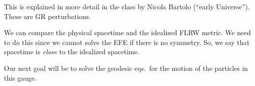 \documentclass[main.tex]{subfiles}
\begin{document}

This is explained in more detail in the class by Nicola Bartolo (``early Universe''). These are GR perturbations. 

We can compare the physical spacetime and the idealized FLRW metric. 
We need to do this since we cannot solve the EFE if there is no symmetry. 
So, we say that spacetime is \emph{close} to the idealized spacetime. 







% 



Our next goal will be to solve the geodesic eqs.\  for the motion of the particles in this gauge. 
\end{document}
